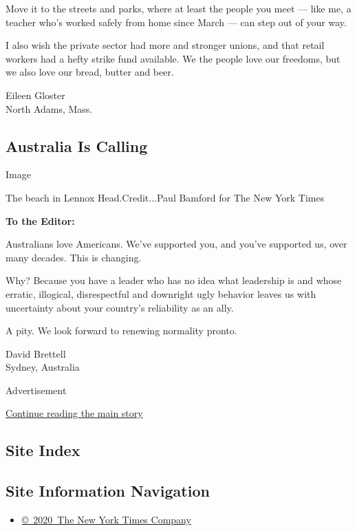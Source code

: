 Move it to the streets and parks, where at least the people you meet ---
like me, a teacher who's worked safely from home since March --- can
step out of your way.

I also wish the private sector had more and stronger unions, and that
retail workers had a hefty strike fund available. We the people love our
freedoms, but we also love our bread, butter and beer.

Eileen Gloster\\
North Adams, Mass.

\hypertarget{australia-is-calling}{%
\subsection{Australia Is Calling}\label{australia-is-calling}}

Image

The beach in Lennox Head.Credit...Paul Bamford for The New York Times

\textbf{To the Editor:}

Australians love Americans. We've supported you, and you've supported
us, over many decades. This is changing.

Why? Because you have a leader who has no idea what leadership is and
whose erratic, illogical, disrespectful and downright ugly behavior
leaves us with uncertainty about your country's reliability as an ally.

A pity. We look forward to renewing normality pronto.

David Brettell\\
Sydney, Australia

Advertisement

\protect\hyperlink{after-bottom}{Continue reading the main story}

\hypertarget{site-index}{%
\subsection{Site Index}\label{site-index}}

\hypertarget{site-information-navigation}{%
\subsection{Site Information
Navigation}\label{site-information-navigation}}

\begin{itemize}
\tightlist
\item
  \href{https://help.nytimes3xbfgragh.onion/hc/en-us/articles/115014792127-Copyright-notice}{©~2020~The
  New York Times Company}
\end{itemize}

